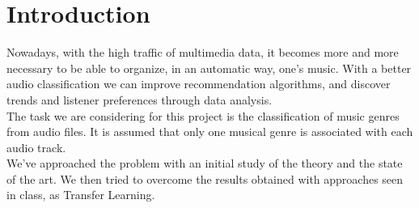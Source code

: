 \section{Introduction}
Nowadays, with the high traffic of multimedia data, it becomes more and more 
necessary to be able to organize, in an automatic way, one's music. 
With a better audio classification we can improve recommendation algorithms, and discover trends and listener preferences through data analysis. \\

The task we are considering for this project is the classification of music 
genres from audio files.
It is assumed that only one musical genre is associated with each audio track. \\

We've approached the problem with an initial study of the theory and the state of the art. 
We then tried to overcome the results obtained with approaches seen in class, as Transfer Learning.